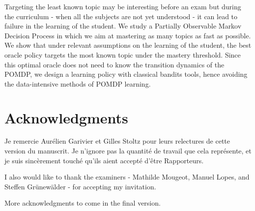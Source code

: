 Targeting the least known topic may be interesting before an exam but during the curriculum - when all the subjects are not yet understood - it can lead to failure in the learning of the student. We study a Partially Observable Markov Decision Process in which we aim at mastering as many topics as fast as possible. We show that under relevant assumptions on the learning of the student, the best oracle policy targets the most known topic under the mastery threshold. Since this optimal oracle does not need to know the transition dynamics of the POMDP, we design a learning policy with classical bandits tools, hence avoiding the data-intensive methods of POMDP learning. 
\newpage

\section*{Acknowledgments}
Je remercie Aurélien Garivier et Gilles Stoltz pour leurs relectures de cette version du manuscrit. Je n'ignore pas la quantité de travail que cela représente, et je suis sincèrement touché qu'ils aient accepté d'être Rapporteurs.

I also would like to thank the examiners - Mathilde Mougeot, Manuel Lopes, and Steffen Grünewälder -  for accepting my invitation.

More acknowledgments to come in the final version.

\cleardoublepage